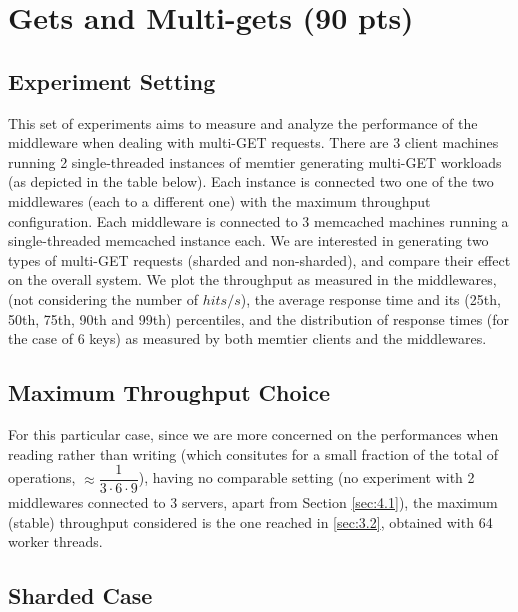 \documentclass[11pt,a4paper]{article}
\begin{document}
\section{Gets and Multi-gets (90 pts)}

\subsection{Experiment Setting}

This set of experiments aims to measure and analyze the performance of the middleware when dealing with multi-GET requests.
There are 3 client machines running 2 single-threaded instances of memtier generating multi-GET workloads (as depicted in the table below). Each instance is connected two one of the two middlewares (each to a different one) with the maximum throughput configuration.
Each middleware is connected to 3 memcached machines running a single-threaded memcached instance each.
We are interested in generating two types of multi-GET requests (sharded and non-sharded), and compare their effect on the overall system.
We plot the throughput as measured in the middlewares, (not considering the number of $hits/s$), the average response time and its (25th, 50th, 75th, 90th and 99th) percentiles, and the distribution of response times (for the case of 6 keys) as measured by both memtier clients and the middlewares.

\subsection*{Maximum Throughput Choice}
For this particular case, since we are more concerned on the performances when reading rather than writing (which consitutes for a small fraction of the total of operations, $\approx \dfrac{1}{3 \cdot 6 \cdot 9}$), having no comparable setting (no experiment with 2 middlewares connected to 3 servers, apart from Section \ref{sec:4.1}), the maximum (stable) throughput considered is the one reached in \ref{sec:3.2}, obtained with 64 worker threads.

\subsection{Sharded Case}
\end{document}
